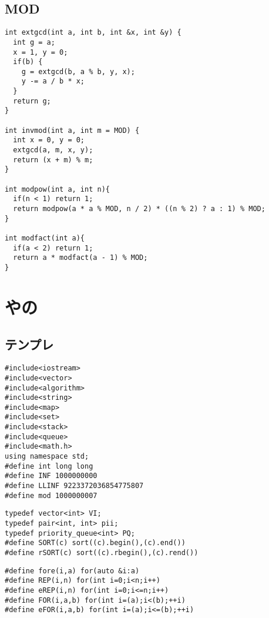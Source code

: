 \documentclass{jsarticle}
\begin{document}
\subsection*{MOD}
\begin{lstlisting}[caption=二分累乗とか]
int extgcd(int a, int b, int &x, int &y) {
  int g = a;
  x = 1, y = 0;
  if(b) {
    g = extgcd(b, a % b, y, x);
    y -= a / b * x;
  }
  return g;
}
  
int invmod(int a, int m = MOD) {
  int x = 0, y = 0;
  extgcd(a, m, x, y);
  return (x + m) % m;
}

int modpow(int a, int n){
  if(n < 1) return 1;
  return modpow(a * a % MOD, n / 2) * ((n % 2) ? a : 1) % MOD;
}

int modfact(int a){
  if(a < 2) return 1;
  return a * modfact(a - 1) % MOD;
}
\end{lstlisting}

\section*{やの}
\subsection*{テンプレ}
\begin{lstlisting}[caption=テンプレ]
#include<iostream>
#include<vector>
#include<algorithm>
#include<string>
#include<map>
#include<set>
#include<stack>
#include<queue>
#include<math.h>
using namespace std;
#define int long long
#define INF 1000000000
#define LLINF 9223372036854775807
#define mod 1000000007
\end{lstlisting}
\begin{lstlisting}[caption=alias]
typedef vector<int> VI;
typedef pair<int, int> pii;
typedef priority_queue<int> PQ;
#define SORT(c) sort((c).begin(),(c).end())
#define rSORT(c) sort((c).rbegin(),(c).rend())
\end{lstlisting}
\begin{lstlisting}[caption=ループ]
#define fore(i,a) for(auto &i:a)
#define REP(i,n) for(int i=0;i<n;i++)
#define eREP(i,n) for(int i=0;i<=n;i++)
#define FOR(i,a,b) for(int i=(a);i<(b);++i)
#define eFOR(i,a,b) for(int i=(a);i<=(b);++i)
\end{lstlisting}
\end{document}
